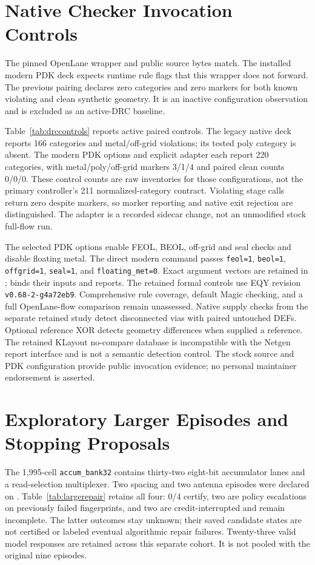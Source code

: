 \documentclass[runningheads]{llncs}
\newcommand{\code}[1]{\texttt{#1}}
\begin{document}
\section{Native Checker Invocation Controls}
The pinned OpenLane wrapper and public source bytes match. The installed
modern PDK deck expects runtime rule flags that this wrapper does not forward.
The previous pairing declares zero categories and zero markers for both known
violating and clean synthetic geometry. It is an inactive configuration
observation and is excluded as an active-DRC baseline.

Table~\ref{tab:drccontrols} reports active paired controls. The legacy native
deck reports 166 categories and metal/off-grid violations; its tested poly
category is absent. The modern PDK options and explicit adapter each report
220 categories, with metal/poly/off-grid markers 3/1/4 and paired clean counts
0/0/0. These control counts are raw inventories for those configurations, not
the primary controller's 211 normalized-category contract. Violating stage
calls return zero despite markers, so marker reporting and native exit rejection
are distinguished. The adapter is a recorded sidecar change, not an unmodified
stock full-flow run.


The selected PDK options enable FEOL, BEOL, off-grid and seal checks and disable
floating metal. The direct modern command passes
\code{feol=1}, \code{beol=1}, \code{offgrid=1}, \code{seal=1}, and
\code{floating\_met=0}. Exact argument vectors are retained in
;
 binds their
inputs and reports. The retained formal controls use EQY revision
\code{v0.68-2-g4a72eb9}.
Comprehensive rule coverage, default Magic checking, and a
full OpenLane-flow comparison remain unassessed. Native supply checks from the
separate retained study detect disconnected vias with paired untouched DEFs.
Optional reference XOR detects geometry differences when supplied a reference.
The retained KLayout no-compare database is incompatible with the Netgen report
interface and is not a semantic detection control. The stock source and PDK
configuration provide public invocation evidence; no personal maintainer
endorsement is asserted.

\section{Exploratory Larger Episodes and Stopping Proposals}
The 1,995-cell \code{accum\_bank32} contains thirty-two eight-bit accumulator
lanes and a read-selection multiplexer. Two spacing and two antenna episodes
were declared on \code{\FrozenSourceShort}. Table~\ref{tab:largerepair} retains
all four: 0/4 certify, two are policy escalations on previously failed
fingerprints, and two are credit-interrupted and remain incomplete. The latter outcomes stay unknown;
their saved candidate states are not certified or labeled eventual algorithmic
repair failures. Twenty-three valid model responses are retained across this
separate cohort. It is not pooled with the original nine episodes.

\end{document}
